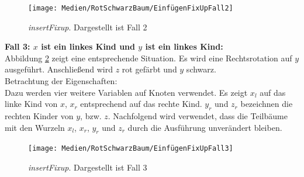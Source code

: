 \documentclass[a4paper,12pt]{article}
\begin{document}
\begin{figure}[H]
	\centering
	\texttt{[image: Medien/RotSchwarzBaum/EinfügenFixUpFall2]}
	\caption{\textit{insertFixup}. Dargestellt ist Fall 2  }
	\label{fig:EinfügenFixUpFall2}
\end{figure}

\noindent\textbf{Fall 3: $x$ ist ein linkes Kind und $y$ ist ein linkes Kind: }\\
\noindent Abbildung \ref{fig:EinfügenFixUpFall3} zeigt eine entsprechende Situation. Es wird eine Rechtsrotation auf $y$ ausgeführt. Anschließend wird $z$ rot gefärbt und $y$ schwarz. \\

\noindent Betrachtung der Eigenschaften:\\
\noindent Dazu werden vier weitere Variablen auf Knoten verwendet. Es zeigt $x_l$ auf das linke Kind von $x$,  $x_r$ entsprechend auf das rechte Kind. $y_r$ und $z_r$ bezeichnen die rechten Kinder von $y$, bzw. $z$. Nachfolgend wird verwendet, dass die Teilbäume mit den Wurzeln $x_l$, $x_r$, $y_r$ und $z_r$ durch die Ausführung unverändert bleiben.
\begin{figure}[H]
	\centering
	\texttt{[image: Medien/RotSchwarzBaum/EinfügenFixUpFall3]}
	\caption{\textit{insertFixup}. Dargestellt ist Fall 3  }
	\label{fig:EinfügenFixUpFall3}
\end{figure}
\end{document}
